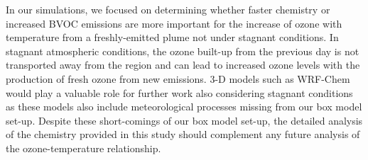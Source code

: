 In our simulations, we focused on determining whether faster chemistry or increased BVOC emissions are more important for the increase of ozone with temperature from a freshly-emitted plume not under stagnant conditions.  
In stagnant atmospheric conditions, the ozone built-up from the previous day is not transported away from the region and can lead to increased ozone levels with the production of fresh ozone from new emissions.  
3-D models such as WRF-Chem would play a valuable role for further work also considering stagnant conditions as these models also include meteorological processes missing from our box model set-up.
Despite these short-comings of our box model set-up, the detailed analysis of the chemistry provided in this study should complement any future analysis of the ozone-temperature relationship.
